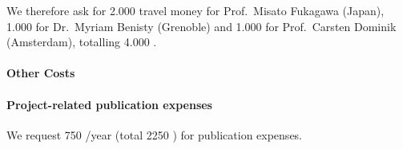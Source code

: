 \documentclass[10pt,fleqn,twoside,a4paper]{article}
\begin{document}
We therefore ask for 2.000 \EUR{} travel money for Prof.~Misato Fukagawa
(Japan), 1.000 \EUR{} for Dr.~Myriam Benisty (Grenoble) and 1.000 \EUR{} for
Prof.~Carsten Dominik (Amsterdam), totalling 4.000 \EUR{}.

\paragraph{Other Costs}

\paragraph{Project-related publication expenses}
We request 750 \EUR{}/year (total 2250 \EUR{}) for publication expenses.



% 
% 
% 
% 
% 
% 
% 
% 
% 
% 
% 
% 
\end{document}
